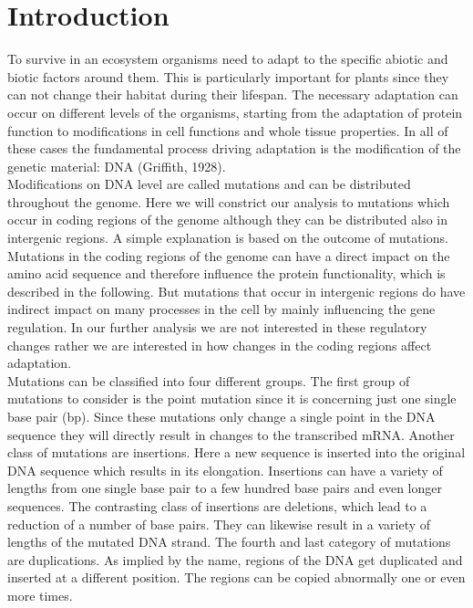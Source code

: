 \chapter{Introduction}
To survive in an ecosystem organisms need to adapt to the specific abiotic and biotic factors around them. This is particularly important for plants since they can not change their habitat during their lifespan. The necessary adaptation can occur on different levels of the organisms, starting from the adaptation of protein function to modifications in cell functions and whole tissue properties. In all of these cases the fundamental process driving adaptation is the modification of the genetic material: DNA (Griffith, 1928\cite{Griffith1928}).\\
Modifications on DNA level are called mutations and can be distributed throughout the genome. Here we will constrict our analysis to mutations which occur in coding regions of the genome although they can be distributed also in intergenic regions. A simple explanation is based on the outcome of mutations. Mutations in the coding regions of the genome can have a direct impact on the amino acid sequence and therefore influence the protein functionality, which is described in the following. But mutations that occur in intergenic regions do have indirect impact on many processes in the cell by mainly influencing the gene regulation. In our further analysis we are not interested in these regulatory changes rather we are interested in how changes in the coding regions affect adaptation.\\
Mutations can be classified into four different groups. The first group of mutations to consider is the point mutation since it is concerning just one single base pair (bp). Since these mutations only change a single point in the DNA sequence they will directly result in changes to the transcribed mRNA. Another class of mutations are insertions. Here a new sequence is inserted into the original DNA sequence which results in its elongation. Insertions can have a variety of lengths from one single base pair to a few hundred base pairs and even longer sequences. The contrasting class of insertions are deletions, which lead to a reduction of a number of base pairs. They can likewise result in a variety of lengths of the mutated DNA strand. The fourth and last category of mutations are duplications. As implied by the name, regions of the DNA get duplicated and inserted at a different position. The regions can be copied abnormally one or even more times.\\

